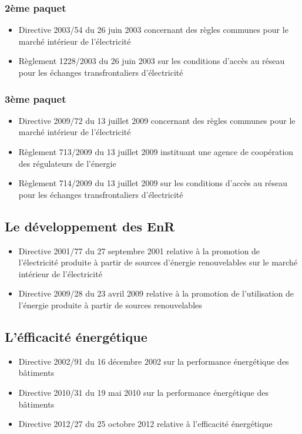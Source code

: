 \subsubsection{2ème paquet}
\begin{itemize}
    \item Directive 2003/54 du 26 juin 2003 concernant des règles communes pour le marché intérieur de l’électricité
    \item Règlement 1228/2003 du 26 juin 2003 sur les conditions d’accès au réseau pour les échanges transfrontaliers d’électricité
\end{itemize}
\subsubsection{3ème paquet}
\begin{itemize}
    \item Directive 2009/72 du 13 juillet 2009 concernant des règles communes pour le marché intérieur de l’électricité
    \item Règlement 713/2009 du 13 juillet 2009 instituant une agence de coopération des régulateurs de l’énergie
    \item Règlement 714/2009 du 13 juillet 2009 sur les conditions d’accès au réseau pour les échanges transfrontaliers d’électricité
\end{itemize}
\newpage
\subsection{Le développement des EnR}
\begin{itemize}
    \item Directive 2001/77 du 27 septembre 2001 relative à la promotion de l’électricité produite à partir de sources d’énergie renouvelables sur le marché intérieur de l’électricité
    \item Directive 2009/28 du 23 avril 2009 relative à la promotion de l’utilisation de l’énergie produite à partir de sources renouvelables 
\end{itemize}
\subsection{L'éfficacité énergétique}
\begin{itemize}
    \item Directive 2002/91 du 16 décembre 2002 sur la performance énergétique des bâtiments
    \item Directive 2010/31 du 19 mai 2010 sur la performance énergétique des bâtiments
    \item Directive 2012/27 du 25 octobre 2012 relative à l’efficacité énergétique
\end{itemize}
